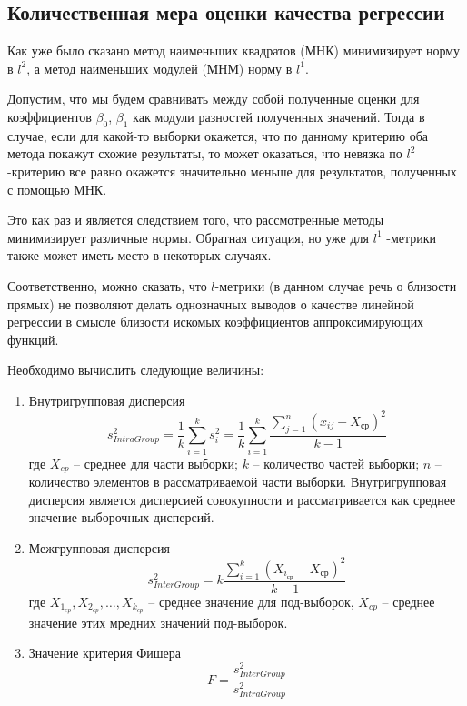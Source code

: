 \documentclass[a4paper]{article}
\begin{document}
        \subsection{Количественная мера оценки качества регрессии}
            Как уже было сказано метод наименьших квадратов (МНК) минимизирует норму в $l^2$, а метод наименьших модулей (МНМ) норму в $l^1$.

            Допустим, что мы будем сравнивать между собой полученные оценки для коэффициентов $\beta_0$, $\beta_1$ как модули разностей полученных значений.
            Тогда в случае, если для какой-то выборки окажется, что по данному критерию оба метода покажут схожие результаты, то может оказаться, что
            невязка по  $l^2$ -критерию все равно окажется значительно меньше для результатов, полученных с помощью МНК.

            Это как раз и является следствием того, что рассмотренные методы минимизирует различные нормы. Обратная ситуация, но уже для  $l^1$ -метрики также может иметь место в некоторых случаях.

            Соответственно, можно сказать, что $l$-метрики (в данном случае речь о близости прямых) не позволяют делать однозначных выводов о качестве линейной регрессии в смысле близости искомых коэффициентов аппроксимирующих функций.

\noindent Необходимо вычислить следующие величины:
\begin{enumerate}
    \item Внутригрупповая дисперсия
    \begin{equation}
        s_{IntraGroup}^{2} = \frac{1}{k} \sum_{i=1}^{k} s_i^{2} = \frac{1}{k} \sum_{i=1}^{k} \frac{\sum_{j=1}^{n} (x_{ij}-X_{ср})^{2}}{k-1}
    \end{equation}
    где $X_{cp}$ -- среднее для части выборки; $k$ -- количество частей выборки; $n$ -- количество элементов в рассматриваемой части выборки.
    Внутригрупповая дисперсия является дисперсией совокупности и рассматривается как среднее значение выборочных дисперсий.
    \item Межгрупповая дисперсия
    \begin{equation}
            s_{InterGroup}^{2}  = k \frac{\sum_{i=1}^{k} (X_{i_{ср}}-X_{ср})^{2}}{k-1}
    \end{equation}
    где $X_{1_{cp}}, X_{2_{cp}}, \dots, X_{k_{cp}}$ -- среднее значение для под-выборок, $X_{cp}$ -- среднее значение этих мредних значений под-выборок.
    \item Значение критерия Фишера
    \begin{equation}
        F=\frac{s_{InterGroup}^{2}}{s_{IntraGroup}^{2}}
    \end{equation}
\end{enumerate}
\end{document}

